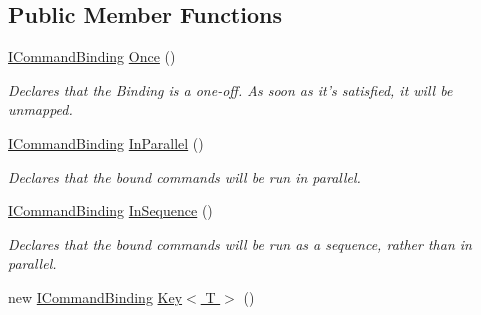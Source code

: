 \subsection*{Public Member Functions}
\begin{DoxyCompactItemize}
\item 
\hypertarget{interfacestrange_1_1extensions_1_1command_1_1api_1_1_i_command_binding_a83a6c902c38775b55ba74e75807cd603}{\hyperlink{interfacestrange_1_1extensions_1_1command_1_1api_1_1_i_command_binding}{I\-Command\-Binding} \hyperlink{interfacestrange_1_1extensions_1_1command_1_1api_1_1_i_command_binding_a83a6c902c38775b55ba74e75807cd603}{Once} ()}\label{interfacestrange_1_1extensions_1_1command_1_1api_1_1_i_command_binding_a83a6c902c38775b55ba74e75807cd603}

\begin{DoxyCompactList}\small\item\em Declares that the Binding is a one-\/off. As soon as it's satisfied, it will be unmapped. \end{DoxyCompactList}\item 
\hyperlink{interfacestrange_1_1extensions_1_1command_1_1api_1_1_i_command_binding}{I\-Command\-Binding} \hyperlink{interfacestrange_1_1extensions_1_1command_1_1api_1_1_i_command_binding_acbaef737b3351ad56d071e214061af1d}{In\-Parallel} ()
\begin{DoxyCompactList}\small\item\em Declares that the bound commands will be run in parallel. \end{DoxyCompactList}\item 
\hypertarget{interfacestrange_1_1extensions_1_1command_1_1api_1_1_i_command_binding_a6cebcf5a61c1b6a8b3c90207be458c58}{\hyperlink{interfacestrange_1_1extensions_1_1command_1_1api_1_1_i_command_binding}{I\-Command\-Binding} \hyperlink{interfacestrange_1_1extensions_1_1command_1_1api_1_1_i_command_binding_a6cebcf5a61c1b6a8b3c90207be458c58}{In\-Sequence} ()}\label{interfacestrange_1_1extensions_1_1command_1_1api_1_1_i_command_binding_a6cebcf5a61c1b6a8b3c90207be458c58}

\begin{DoxyCompactList}\small\item\em Declares that the bound commands will be run as a sequence, rather than in parallel. \end{DoxyCompactList}\item 
\hypertarget{interfacestrange_1_1extensions_1_1command_1_1api_1_1_i_command_binding_a0c4ce9b4f6175ba27d30a17ceda8741e}{new \hyperlink{interfacestrange_1_1extensions_1_1command_1_1api_1_1_i_command_binding}{I\-Command\-Binding} \hyperlink{interfacestrange_1_1extensions_1_1command_1_1api_1_1_i_command_binding_a0c4ce9b4f6175ba27d30a17ceda8741e}{Key$<$ T $>$} ()}\label{interfacestrange_1_1extensions_1_1command_1_1api_1_1_i_command_binding_a0c4ce9b4f6175ba27d30a17ceda8741e}


\end{DoxyCompactItemize}
